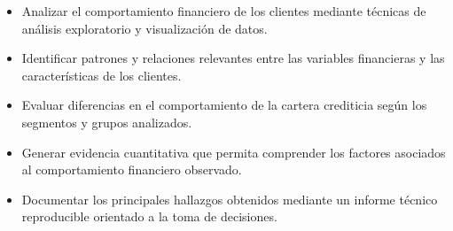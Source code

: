 







\begin{itemize}

\item Analizar el comportamiento financiero de los clientes mediante técnicas de análisis exploratorio y visualización de datos.

\item Identificar patrones y relaciones relevantes entre las variables financieras y las características de los clientes.

\item Evaluar diferencias en el comportamiento de la cartera crediticia según los segmentos y grupos analizados.

\item Generar evidencia cuantitativa que permita comprender los factores asociados al comportamiento financiero observado.

\item Documentar los principales hallazgos obtenidos mediante un informe técnico reproducible orientado a la toma de decisiones.

\end{itemize}
